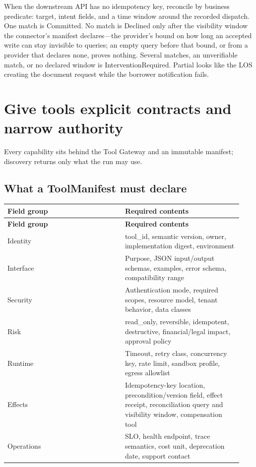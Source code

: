 When the downstream API has no idempotency key, reconcile by business predicate: target, intent fields, and a time window around the recorded dispatch. One match is Committed. No match is Declined only after the visibility window the connector's manifest declares—the provider's bound on how long an accepted write can stay invisible to queries; an empty query before that bound, or from a provider that declares none, proves nothing. Several matches, an unverifiable match, or no declared window is InterventionRequired. Partial looks like the LOS creating the document request while the borrower notification fails.\par

\section{Give tools explicit contracts and narrow authority}

Every capability sits behind the Tool Gateway and an immutable manifest; discovery returns only what the run may use.\par

\subsection{What a ToolManifest must declare}

\BookTableStart
\small
\begin{longtable}{@{}Y{0.4700\linewidth}Y{0.4700\linewidth}@{}}
\color{white}\bfseries \textbf{Field group} & \color{white}\bfseries \textbf{Required contents} \\
\endfirsthead
{}
\color{white}\bfseries \textbf{Field group} & \color{white}\bfseries \textbf{Required contents} \\
\endhead
Identity & tool\_id, semantic version, owner, implementation digest, environment \\
Interface & Purpose, JSON input/output schemas, examples, error schema, compatibility range \\
Security & Authentication mode, required scopes, resource model, tenant behavior, data classes \\
Risk & read\_only, reversible, idempotent, destructive, financial/legal impact, approval policy \\
Runtime & Timeout, retry class, concurrency key, rate limit, sandbox profile, egress allowlist \\
Effects & Idempotency-key location, precondition/version field, effect receipt, reconciliation query and visibility window, compensation tool \\
Operations & SLO, health endpoint, trace semantics, cost unit, deprecation date, support contact \\
\end{longtable}
\BookTableEnd

